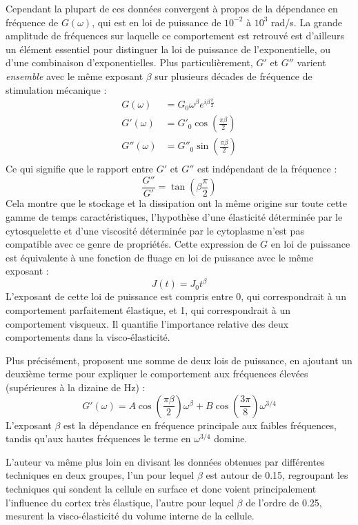 Cependant la plupart de ces données convergent à propos de la dépendance en fréquence de $G(\omega)$, qui est en loi de puissance de $10^{-2}$ à $10^3$ rad/s. La grande amplitude de fréquences sur laquelle ce comportement est retrouvé est d'ailleurs un élément essentiel pour distinguer la loi de puissance de l'exponentielle, ou d'une combinaison d'exponentielles. Plus particulièrement, $G'$ et $G''$ varient \emph{ensemble} avec le même exposant $\beta$ sur plusieurs décades de fréquence de stimulation mécanique : 
\begin{align}
G(\omega)&=G_0 \omega^{\beta} e^{i \beta \frac{\pi}{2}} \\
G'(\omega)&=G'_0 \cos \left( \frac{\pi \beta}{2} \right) \\
G''( \omega)&=G''_0 \sin \left( \frac{\pi \beta}{2} \right) \\
\end{align} 
Ce qui signifie que le rapport entre $G'$ et $G''$ est indépendant de la fréquence : 
$$ \frac{G''}{G'} = \tan \left( \beta \frac{\pi}{2} \right)$$
Cela montre que le stockage et la dissipation ont la même origine sur toute cette gamme de temps caractéristiques, l'hypothèse d'une élasticité déterminée par le cytosquelette et d’une viscosité déterminée par le cytoplasme n'est pas compatible avec ce genre de propriétés. 
Cette expression de $G$ en loi de puissance est équivalente à une fonction de fluage en loi de puissance avec le même exposant : 
$$ J(t)= J_0 t^{\beta}$$
L'exposant de cette loi de puissance est compris entre 0, qui correspondrait à un comportement parfaitement élastique, et 1, qui correspondrait à un comportement visqueux. Il quantifie l'importance relative des deux comportements dans la visco-élasticité. 


 Plus précisément, \cite{hoffman_cell_2009} proposent une somme de deux lois de puissance, en ajoutant un deuxième terme pour expliquer le comportement aux fréquences élevées (supérieures à la dizaine de Hz) : 
$$G'(\omega)= A \cos \left(\frac{\pi \beta}{2}\right) \omega^{\beta} + B \cos\left(\frac{3 \pi}{8}\right) \omega^{3/4}$$
L'exposant $\beta$ est la dépendance en fréquence principale aux faibles fréquences, tandis qu'aux hautes fréquences le terme en $\omega^{3/4}$ domine. 

L'auteur va même plus loin en divisant les données obtenues par différentes techniques en deux groupes, l'un pour lequel $\beta$ est autour de 0.15, regroupant les techniques qui sondent la cellule en surface et donc voient principalement l'influence du cortex très élastique, l'autre pour lequel $\beta$ de l’ordre de 0.25, mesurent la visco-élasticité du volume interne de la cellule. 

